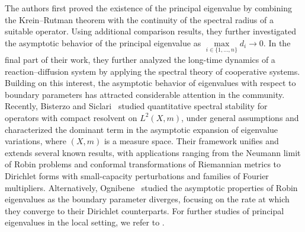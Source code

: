 \documentclass[a4paper,11pt]{amsart}
\theoremstyle{definition}
\numberwithin{equation}{section}
\theoremstyle{definition}
\begin{document}
The authors first proved the existence of the principal eigenvalue by combining the Krein–Rutman theorem with the continuity of the spectral radius of a suitable operator. Using additional comparison results, they further investigated the asymptotic behavior of the principal eigenvalue as $\max\limits_{i\in\{1,\dots,n\}} d_i \to 0$. In the final part of their work, they further analyzed the long-time dynamics of a reaction–diffusion system by applying the spectral theory of cooperative systems. Building on this interest, the asymptotic behavior of eigenvalues with respect to boundary parameters has attracted considerable attention in the community. Recently, Bisterzo and Siclari~\cite{bisterzo_siclari_2025} studied quantitative spectral stability for operators with compact resolvent on $L^2(X,m)$, under general assumptions and characterized the dominant term in the asymptotic expansion of eigenvalue variations, where $(X,m)$ is a measure space. Their framework unifies and extends several known results, with applications ranging from the Neumann limit of Robin problems and conformal transformations of Riemannian metrics to Dirichlet forms with small-capacity perturbations and families of Fourier multipliers. Alternatively, Ognibene~\cite{ognibene_2025} studied the asymptotic properties of Robin eigenvalues as the boundary parameter diverges, focusing on the rate at which they converge to their Dirichlet counterparts. For further studies of principal eigenvalues in the local setting, we refer to \cite{bai_he_2020,anton_lopez_2019,lam_Introduction_2022,Lemenant_2013}.
\end{document}
